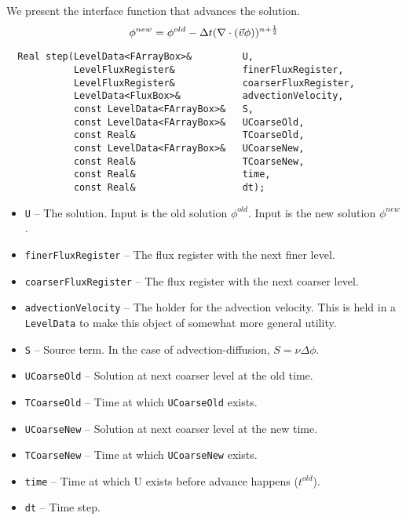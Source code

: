 We present the interface function that advances the solution.
$$
\phi^{new} = \phi^{old} - \Delta t (\nabla \cdot (\vec v \phi) )^{n+\frac{1}{2}}
$$
\begin{small}
\begin{verbatim}
  Real step(LevelData<FArrayBox>&         U,
            LevelFluxRegister&            finerFluxRegister,
            LevelFluxRegister&            coarserFluxRegister,
            LevelData<FluxBox>&           advectionVelocity,
            const LevelData<FArrayBox>&   S,
            const LevelData<FArrayBox>&   UCoarseOld,
            const Real&                   TCoarseOld,
            const LevelData<FArrayBox>&   UCoarseNew,
            const Real&                   TCoarseNew,
            const Real&                   time,
            const Real&                   dt);
\end{verbatim}
\end{small}
\begin{itemize}
\item \verb|U| -- The solution.   Input is the old solution $\phi^{old}$.  Input is the new solution $\phi^{new}$.
\item \verb|finerFluxRegister| -- The flux register with the next finer level.
\item \verb|coarserFluxRegister| -- The flux register with the next coarser level.
\item \verb|advectionVelocity| -- The holder for the advection velocity.
  This is held in a \verb|LevelData| to make this object of somewhat more 
  general utility.
\item \verb|S| -- Source term.  In the case of advection-diffusion, $S= \nu \Delta \phi$.
\item \verb|UCoarseOld| -- Solution at next coarser level at the old time.   
\item \verb|TCoarseOld| -- Time at which \verb|UCoarseOld| exists.
\item \verb|UCoarseNew| -- Solution at next coarser level at the new time.   
\item \verb|TCoarseNew| -- Time at which \verb|UCoarseNew| exists.
\item \verb|time| -- Time at which U exists before advance happens ($t^{old}$).
\item \verb|dt|  -- Time step.
\end{itemize}
